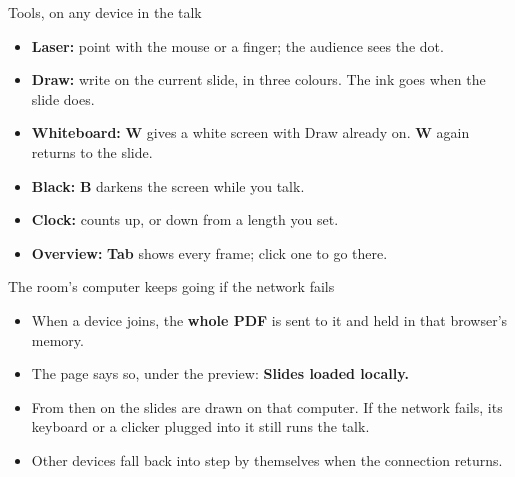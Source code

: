 \documentclass[aspectratio=169,14pt]{beamer}
\newcommand{\key}[1]{\textbf{#1}}
\begin{document}
\begin{frame}{Tools, on any device in the talk}
  \begin{itemize}
    \item \textbf{Laser:} point with the mouse or a finger; the audience sees the dot.
    \item<2-> \textbf{Draw:} write on the current slide, in three colours. The ink goes when the slide does.
    \item<3-> \textbf{Whiteboard:} \key{W} gives a white screen with Draw already on. \key{W} again returns to the slide.
    \item<4-> \textbf{Black:} \key{B} darkens the screen while you talk.
    \item<5-> \textbf{Clock:} counts up, or down from a length you set.
    \item<6-> \textbf{Overview:} \key{Tab} shows every frame; click one to go there.
  \end{itemize}
\end{frame}

\begin{frame}{The room's computer keeps going if the network fails}
  \begin{itemize}
    \item When a device joins, the \textbf{whole PDF} is sent to it and held in that browser's memory.
    \item<2-> The page says so, under the preview: \textbf{Slides loaded locally.}
    \item<3-> From then on the slides are drawn on that computer. If the network fails, its keyboard or a clicker plugged into it still runs the talk.
    \item<4-> Other devices fall back into step by themselves when the connection returns.
  \end{itemize}
\end{frame}
\end{document}
